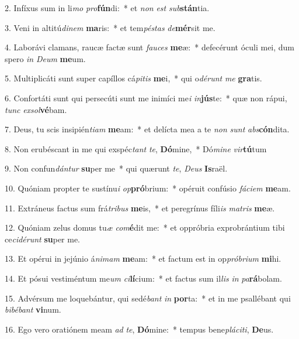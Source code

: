 2. Infíxus sum in li\textit{mo} \textit{pro}\textbf{fún}di:~*  et \textit{non} \textit{est} \textit{sub}\textbf{stán}tia.\

3. Veni in altitú\textit{di}\textit{nem} \textbf{ma}ris:~*  et tem\textit{pés}\textit{tas} \textit{de}\textbf{mér}sit me.\

4. Laborávi clamans, raucæ factæ sunt \textit{fau}\textit{ces} \textbf{me}æ:~*  defecérunt óculi mei, dum spero \textit{in} \textit{De}\textit{um} \textbf{me}um.\

5. Multiplicáti sunt super capíllos cá\textit{pi}\textit{tis} \textbf{me}i,~*  qui o\textit{dé}\textit{runt} \textit{me} \textbf{gra}tis.\

6. Confortáti sunt qui persecúti sunt me inimíci me\textit{i} \textit{in}\textbf{jús}te:~*  quæ non rápui, \textit{tunc} \textit{ex}\textit{sol}\textbf{vé}bam.\

7. Deus, tu scis insipién\textit{ti}\textit{am} \textbf{me}am:~*  et delícta mea a te \textit{non} \textit{sunt} \textit{abs}\textbf{cón}dita.\

8. Non erubéscant in me qui exspéc\textit{tant} \textit{te}, \textbf{Dó}mine,~*  Dó\textit{mi}\textit{ne} \textit{vir}\textbf{tú}tum\

9. Non confun\textit{dán}\textit{tur} \textbf{su}per me~*  qui quærunt \textit{te}, \textit{De}\textit{us} \textbf{Is}raël.\

10. Quóniam propter te sustínu\textit{i} \textit{op}\textbf{pró}brium:~*  opéruit confúsio \textit{fá}\textit{ci}\textit{em} \textbf{me}am.\

11. Extráneus factus sum frá\textit{tri}\textit{bus} \textbf{me}is,~*  et peregrínus fíli\textit{is} \textit{ma}\textit{tris} \textbf{me}æ.\

12. Quóniam zelus domus tu\textit{æ} \textit{com}\textbf{é}dit me:~*  et oppróbria exprobrántium tibi ce\textit{ci}\textit{dé}\textit{runt} \textbf{su}per me.\

13. Et opérui in jejúnio á\textit{ni}\textit{mam} \textbf{me}am:~*  et factum est in op\textit{pró}\textit{bri}\textit{um} \textbf{mi}hi.\

14. Et pósui vestiméntum me\textit{um} \textit{ci}\textbf{lí}cium:~*  et factus sum il\textit{lis} \textit{in} \textit{pa}\textbf{rá}bolam.\

15. Advérsum me loquebántur, qui sedé\textit{bant} \textit{in} \textbf{por}ta:~*  et in me psallébant qui \textit{bi}\textit{bé}\textit{bant} \textbf{vi}num.\

16. Ego vero oratiónem meam \textit{ad} \textit{te}, \textbf{Dó}mine:~*  tempus bene\textit{plá}\textit{ci}\textit{ti}, \textbf{De}us.\

